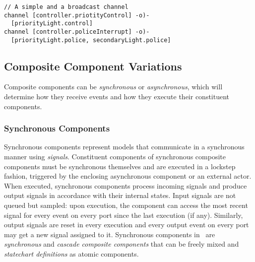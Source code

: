 
\begin{lstlisting}
// A simple and a broadcast channel
channel [controller.priotityControl] -o)-
  [priorityLight.control]
channel [controller.policeInterrupt] -o)-
  [priorityLight.police, secondaryLight.police]
\end{lstlisting}

\subsection{Composite Component Variations}
\label{sec:composite}

Composite components can be \emph{synchronous} or \emph{asynchronous}, which will determine how they receive events and how they execute their constituent components.

\subsubsection{Synchronous Components}
Synchronous components represent models that communicate
in a synchronous manner using \emph{signals}. Constituent components of synchronous composite components must be synchronous themselves and are executed in a lockstep fashion, triggered by the enclosing asynchronous component or an external actor.
When executed, synchronous components process incoming signals
and produce output signals in accordance with their internal states. Input signals are not queued but sampled: upon execution, the component can access the most recent signal for every event on every port since the last execution (if any). Similarly, output signals are reset in every execution and every output event on every port may get a new signal assigned to it.
Synchronous components in \gamma\ are \emph{synchronous} and \emph{cascade composite components} that can be freely mixed and \emph{statechart definitions} as atomic components.%

